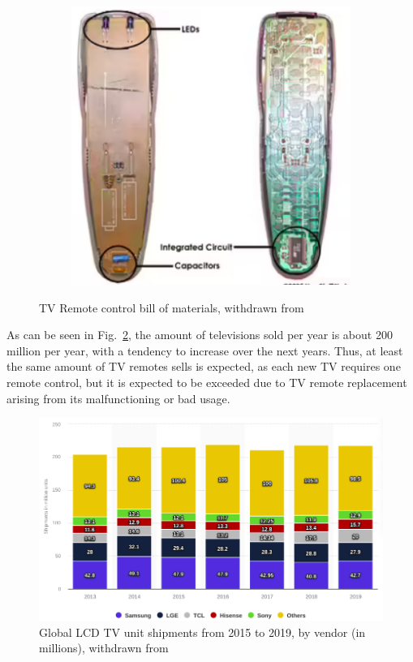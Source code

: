 \begin{figure}[htb!]
\begin{subfigure}{.4\textwidth}
    \includegraphics[width=\textwidth]{img/remotematerial2.png}%
\end{subfigure}
%
  \caption{TV Remote control bill of materials, withdrawn from~\cite{remotematerial}}%
  \label{fig:remotemat}
\end{figure}

As can be seen in Fig.~\ref{fig:tvsells}, the amount of televisions sold per
year is about 200 million per year, with a tendency to increase over the next
years. Thus, at least the same amount of TV remotes sells is expected, as each
new TV requires one remote control, but it is expected to be exceeded due to TV
remote replacement arising from its malfunctioning or bad usage.
%
\begin{figure}[htb!]
\centering
    \includegraphics[width=0.7\columnwidth]{./img/tvsellings.png}
  \caption{Global LCD TV unit shipments from 2015 to 2019, by vendor (in
    millions), withdrawn from~\cite{tvsellings}}%
\label{fig:tvsells}
\end{figure}
